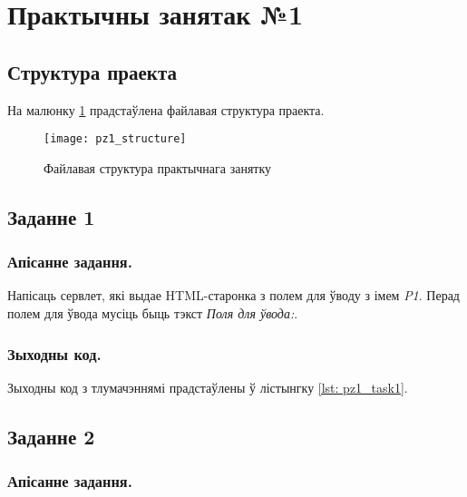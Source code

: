 \section{Практычны занятак №1}

\subsection{Структура праекта}

На малюнку \ref{img: pz1} прадстаўлена файлавая структура праекта.

\begin{figure}[h!]
    \centering
    \texttt{[image: pz1\_structure]}
    \caption{Файлавая структура практычнага занятку}
    \label{img: pz1} 
\end{figure}

\vspace{-\baselineskip}
\subsection{Заданне 1}

\subsubsection{Апісанне задання.}

Напісаць сервлет, які выдае HTML-старонка з полем для ўводу з
імем \textit{P1}. Перад полем для ўвода мусіць быць тэкст
\textit{Поля для ўвода:}.

\subsubsection{Зыходны код.}

Зыходны код з тлумачэннямі прадстаўлены
ў лістынгку \ref{lst: pz1_task1}.


\vspace{-\baselineskip}
\subsection{Заданне 2}

\subsubsection{Апісанне задання.}

